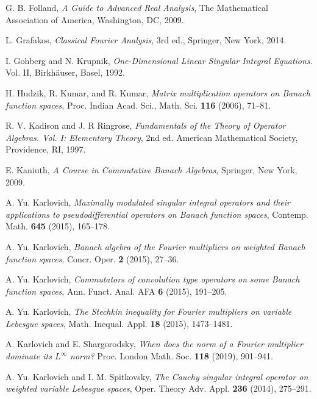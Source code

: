 \documentclass{birkjour}
\numberwithin{equation}{section}
\begin{document}
\begin{thebibliography}{XX}
G. B. Folland,
\textit{A Guide to Advanced Real Analysis},
The Mathematical Association of America,
Washington, DC, 2009.

L. Grafakos,
\textit{Classical Fourier Analysis}, 3rd ed.,
Springer, New York, 2014.

I. Gohberg and N. Krupnik,
\textit{One-Dimensional Linear Singular Integral Equations}. Vol. II,
Birkh\"auser, Basel, 1992.

H. Hudzik, R. Kumar, and R. Kumar,
\textit{Matrix multiplication operators on Banach function spaces},
Proc. Indian Acad. Sci., Math. Sci. \textbf{116} (2006), 71--81.

R. V. Kadison and J. R Ringrose,
\textit{Fundamentals of the Theory of Operator Algebras.
Vol. I: Elementary Theory}, 2nd ed.
American Mathematical Society, Providence, RI, 1997.

E. Kaniuth,
\textit{A Course in Commutative Banach Algebras},
Springer, New York, 2009.

A. Yu. Karlovich,
\textit{Maximally modulated singular integral operators and their applications
to pseudodifferential operators on Banach function spaces},
Contemp. Math. \textbf{645} (2015), 165--178.

A. Yu. Karlovich,
\textit{Banach algebra of the Fourier multipliers on weighted Banach function spaces},
Concr. Oper. \textbf{2} (2015), 27--36.

A. Yu. Karlovich,
\textit{Commutators of convolution type operators on some Banach function spaces},
Ann. Funct. Anal. AFA \textbf{6} (2015), 191--205.

A. Yu. Karlovich,
\textit{The Stechkin inequality for Fourier multipliers on variable Lebesgue spaces},
Math. Inequal. Appl. \textbf{18} (2015), 1473--1481.

A. Karlovich and E. Shargorodsky,
\textit{When does the norm of a Fourier multiplier dominate its $L^\infty$ norm?}
Proc. London Math. Soc. \textbf{118} (2019), 901--941.

A. Yu. Karlovich and I. M. Spitkovsky,
\textit{The Cauchy singular integral operator on weighted variable Lebesgue spaces},
Oper. Theory Adv. Appl. \textbf{236} (2014), 275--291.


\end{thebibliography}
\end{document}
